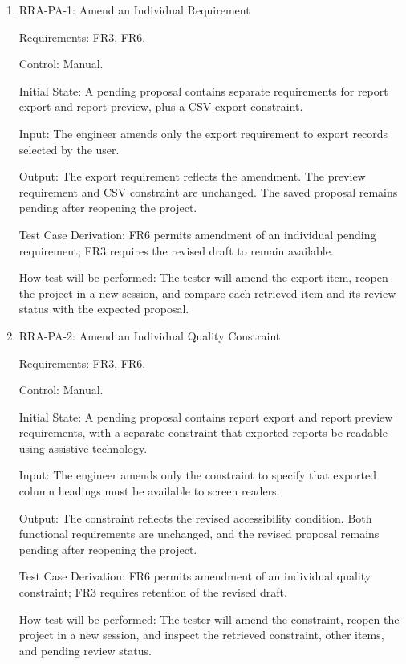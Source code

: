 \documentclass[12pt, titlepage]{article}
\begin{document}
\begin{enumerate}

\item{RRA-PA-1: Amend an Individual Requirement\\}

Requirements: FR3, FR6.

Control: Manual.

Initial State: A pending proposal contains separate requirements for report
export and report preview, plus a CSV export constraint.

Input: The engineer amends only the export requirement to export records
selected by the user.

Output: The export requirement reflects the amendment. The preview requirement
and CSV constraint are unchanged. The saved proposal remains pending after
reopening the project.

Test Case Derivation: FR6 permits amendment of an individual pending
requirement; FR3 requires the revised draft to remain available.

How test will be performed: The tester will amend the export item, reopen the
project in a new session, and compare each retrieved item and its review
status with the expected proposal.

\item{RRA-PA-2: Amend an Individual Quality Constraint\\}

Requirements: FR3, FR6.

Control: Manual.

Initial State: A pending proposal contains report export and report preview
requirements, with a separate constraint that exported reports be readable
using assistive technology.

Input: The engineer amends only the constraint to specify that exported column
headings must be available to screen readers.

Output: The constraint reflects the revised accessibility condition. Both
functional requirements are unchanged, and the revised proposal remains
pending after reopening the project.

Test Case Derivation: FR6 permits amendment of an individual quality
constraint; FR3 requires retention of the revised draft.

How test will be performed: The tester will amend the constraint, reopen the
project in a new session, and inspect the retrieved constraint, other items,
and pending review status.


\end{enumerate}
\end{document}
